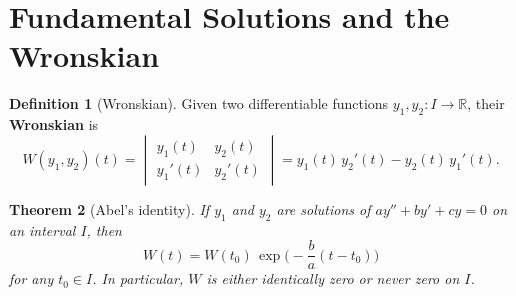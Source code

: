 \documentclass[12pt,a4paper,openany]{book}
\theoremstyle{definition}
\newtheorem{definition}{Definition}[chapter]
\theoremstyle{plain}
\newtheorem{theorem}[definition]{Theorem}
\theoremstyle{remark}
\newcommand{\R}{\mathbb{R}}
\begin{document}
\begin{center}
\end{center}

\section{Fundamental Solutions and the Wronskian}\label{sec:wronskian}

\begin{definition}[Wronskian]\label{def:wronskian}
Given two differentiable functions $y_1, y_2\colon I \to \R$, their
\textbf{Wronskian} is
\begin{equation}\label{eq:wronskian-def}
  W(y_1, y_2)(t) = \begin{vmatrix} y_1(t) & y_2(t) \\
  y_1'(t) & y_2'(t) \end{vmatrix}
  = y_1(t)\,y_2'(t) - y_2(t)\,y_1'(t).
\end{equation}
\end{definition}

\begin{theorem}[Abel's identity]\label{thm:abel}
If $y_1$ and $y_2$ are solutions of $ay'' + by' + cy = 0$ on an interval $I$,
then
\begin{equation}\label{eq:abel}
  W(t) = W(t_0)\,\exp\!\biggl(-\frac{b}{a}(t - t_0)\biggr)
\end{equation}
for any $t_0 \in I$. In particular, $W$ is either identically zero or never
zero on $I$.
\end{theorem}
\end{document}

